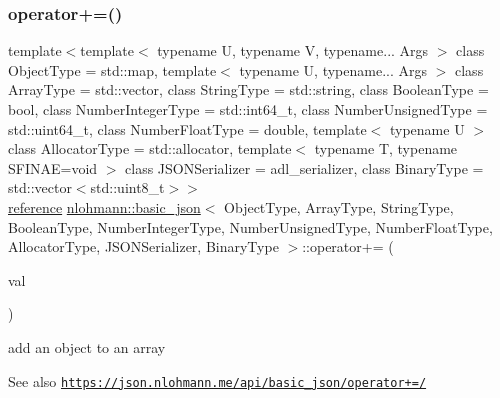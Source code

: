 \subsubsection{\texorpdfstring{operator+=()}{operator+=()}\hspace{0.1cm}{\footnotesize\ttfamily [1/4]}}
{\footnotesize\ttfamily template$<$template$<$ typename U, typename V, typename... Args $>$ class Object\+Type = std\+::map, template$<$ typename U, typename... Args $>$ class Array\+Type = std\+::vector, class String\+Type  = std\+::string, class Boolean\+Type  = bool, class Number\+Integer\+Type  = std\+::int64\+\_\+t, class Number\+Unsigned\+Type  = std\+::uint64\+\_\+t, class Number\+Float\+Type  = double, template$<$ typename U $>$ class Allocator\+Type = std\+::allocator, template$<$ typename T, typename S\+F\+I\+N\+A\+E=void $>$ class J\+S\+O\+N\+Serializer = adl\+\_\+serializer, class Binary\+Type  = std\+::vector$<$std\+::uint8\+\_\+t$>$$>$ \\
\hyperlink{classnlohmann_1_1basic__json_a220ae98554a76205fb7f8822d36b2d5a}{reference} \hyperlink{classnlohmann_1_1basic__json}{nlohmann\+::basic\+\_\+json}$<$ Object\+Type, Array\+Type, String\+Type, Boolean\+Type, Number\+Integer\+Type, Number\+Unsigned\+Type, Number\+Float\+Type, Allocator\+Type, J\+S\+O\+N\+Serializer, Binary\+Type $>$\+::operator+= (\begin{DoxyParamCaption}\item[{\hyperlink{classnlohmann_1_1basic__json}{basic\+\_\+json}$<$ Object\+Type, Array\+Type, String\+Type, Boolean\+Type, Number\+Integer\+Type, Number\+Unsigned\+Type, Number\+Float\+Type, Allocator\+Type, J\+S\+O\+N\+Serializer, Binary\+Type $>$ \&\&}]{val }\end{DoxyParamCaption})\hspace{0.3cm}{\ttfamily [inline]}}



add an object to an array 

\begin{DoxySeeAlso}{See also}
\href{https://json.nlohmann.me/api/basic_json/operator+=/}{\tt https\+://json.\+nlohmann.\+me/api/basic\+\_\+json/operator+=/} 
\end{DoxySeeAlso}
\mbox{\label{classnlohmann_1_1basic__json_af643a4baa91f484b11af0e4437183115}} 
